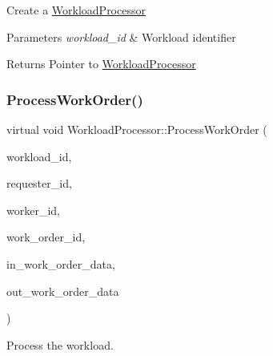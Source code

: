 Create a \hyperlink{classWorkloadProcessor}{Workload\+Processor}


\begin{DoxyParams}{Parameters}
{\em workload\+\_\+id} & Workload identifier \\
\hline
\end{DoxyParams}
\begin{DoxyReturn}{Returns}
Pointer to \hyperlink{classWorkloadProcessor}{Workload\+Processor} 
\end{DoxyReturn}
\mbox{\label{classWorkloadProcessor_a62cdfb1a67991496856a32a33c1845fb}} 
\subsubsection{\texorpdfstring{Process\+Work\+Order()}{ProcessWorkOrder()}}
{\footnotesize\ttfamily virtual void Workload\+Processor\+::\+Process\+Work\+Order (\begin{DoxyParamCaption}\item[{std\+::string}]{workload\+\_\+id,  }\item[{const \hyperlink{types_8h_a35da937e2331acce98d47f44892f4a76}{Byte\+Array} \&}]{requester\+\_\+id,  }\item[{const \hyperlink{types_8h_a35da937e2331acce98d47f44892f4a76}{Byte\+Array} \&}]{worker\+\_\+id,  }\item[{const \hyperlink{types_8h_a35da937e2331acce98d47f44892f4a76}{Byte\+Array} \&}]{work\+\_\+order\+\_\+id,  }\item[{const std\+::vector$<$ \hyperlink{classtcf_1_1WorkOrderData}{tcf\+::\+Work\+Order\+Data} $>$ \&}]{in\+\_\+work\+\_\+order\+\_\+data,  }\item[{std\+::vector$<$ \hyperlink{classtcf_1_1WorkOrderData}{tcf\+::\+Work\+Order\+Data} $>$ \&}]{out\+\_\+work\+\_\+order\+\_\+data }\end{DoxyParamCaption})\hspace{0.3cm}{\ttfamily [pure virtual]}}

Process the workload.


